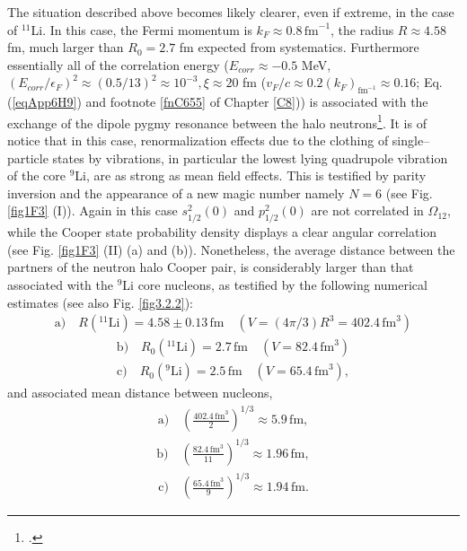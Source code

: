 The situation described above becomes likely clearer, even if extreme, in the case of $^{11}$Li. In this case, the Fermi momentum is $k_F\approx 0.8\, \text{fm}^{-1}$, the radius $R\approx 4.58 $fm, much larger than $R_0=2.7$ fm expected from systematics. Furthermore essentially all of the correlation energy ($E_{corr}\approx -0.5$ MeV, $(E_{corr}/\epsilon_F)^2\approx (0.5/13)^2\approx 10^{-3}, \xi\approx 20 $ fm ($v_F/c\approx0.2(k_F)_{\text{fm}^{-1}}\approx 0.16$; Eq. (\ref{eqApp6H9}) and footnote \ref{fnC655} of Chapter \ref{C8})) is associated with the exchange of the dipole pygmy resonance between the halo neutrons\footnote{\cite{Broglia:19}.}. It is of notice that in this case, renormalization effects due to the clothing of single--particle states by vibrations, in particular the lowest lying quadrupole vibration of the core $^9$Li, are as strong as mean field effects. This is testified by parity inversion and the appearance of a new magic number namely $N=6$ (see Fig. \ref{fig1F3} (I)). Again in this case $s_{1/2}^2(0)$ and $p_{1/2}^2(0)$ are not correlated in $\Omega_{12}$, while the Cooper state probability density displays a clear angular correlation (see Fig. \ref{fig1F3} (II) (a) and (b)). Nonetheless, the average distance between the partners of the neutron halo Cooper pair, is considerably larger than that associated with the $^9$Li core nucleons, as testified by the following numerical estimates (see also Fig. \ref{fig3.2.2}):
\begin{align}\label{eq3.2.21}
 \text{a)}\quad R(^{11}\text{Li})= 4.58\pm 0.13 \,\text{fm}\quad (V=\left(4\pi/3\right)R^3=402.4 \,\text{fm}^3)
\end{align}
\begin{align}
 \text{b)}\quad R_0 (^{11}\text{Li})=2.7\,\text{fm}\quad (V=82.4\,\text{fm}^3)
\end{align}
\begin{align}
 \text{c)}\quad R_0 (^{9}\text{Li})=2.5\,\text{fm}\quad (V=65.4\,\text{fm}^3),
\end{align}
and associated mean distance between nucleons, 
\begin{align}\label{eq3.2.24}
 \text{a)}\quad \left(\frac{402.4\,\text{fm}^3}{2}\right)^{1/3}\approx 5.9\,\text{fm},
\end{align}
\begin{align}
 \text{b)}\quad \left(\frac{82.4\,\text{fm}^3}{11}\right)^{1/3}\approx 1.96\,\text{fm},
\end{align}
\begin{align}
 \text{c)}\quad \left(\frac{65.4\,\text{fm}^3}{9}\right)^{1/3}\approx 1.94\,\text{fm}.
\end{align}




